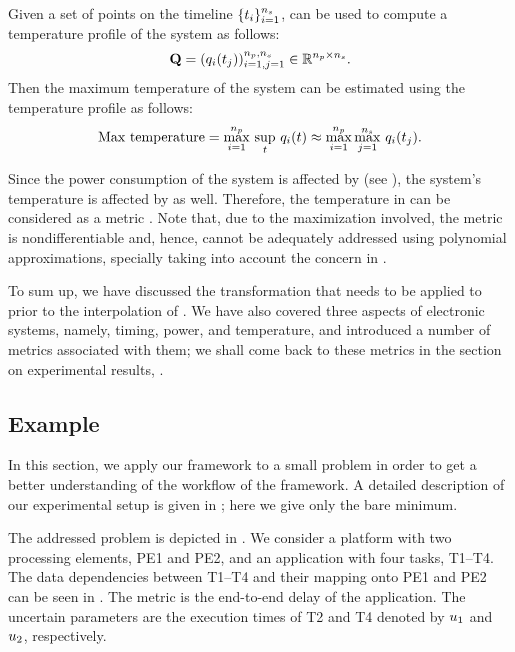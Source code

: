 Given a set of \ns points on the timeline $\{ t_i \}_{i = 1}^{n_{s}}$,
 can be used to compute a temperature profile of the system
as follows:
\[
  \mathbf{Q} = (q_i(t_j))_{i = 1, j = 1}^{{n_{p}}, {n_{s}}} \in \mathbb{R}^{{n_{p}} \times {n_{s}}}.
\]
Then the maximum temperature of the system can be estimated using the
temperature profile as follows:
\[
  \text{Max temperature} = \max_{i = 1}^{n_{p}} \, \sup_{t} \, q_i(t) \approx \max_{i = 1}^{n_{p}} \max_{j = 1}^{n_{s}} \, q_i(t_j).
\]

Since the power consumption of the system is affected by \vu (see ),
the system's temperature is affected by \vu as well. Therefore, the temperature
in  can be considered as a metric \g. Note that, due
to the maximization involved, the metric is nondifferentiable and, hence, cannot
be adequately addressed using polynomial approximations, specially taking into
account the concern in .

To sum up, we have discussed the transformation that needs to be applied to \vu
prior to the interpolation of \g. We have also covered three aspects of
electronic systems, namely, timing, power, and temperature, and introduced a
number of metrics associated with them; we shall come back to these metrics in
the section on experimental results, .

\subsection{Example}

In this section, we apply our framework to a small problem in order to get a
better understanding of the workflow of the framework. A detailed description of
our experimental setup is given in ; here we give only the
bare minimum.

The addressed problem is depicted in . We consider a platform with
two processing elements, PE1 and PE2, and an application with four tasks,
T1--T4. The data dependencies between T1--T4 and their mapping onto PE1 and PE2
can be seen in . The metric \g is the end-to-end delay of the
application. The uncertain parameters \vu are the execution times of T2 and T4
denoted by $u_1$ and $u_2$, respectively.

